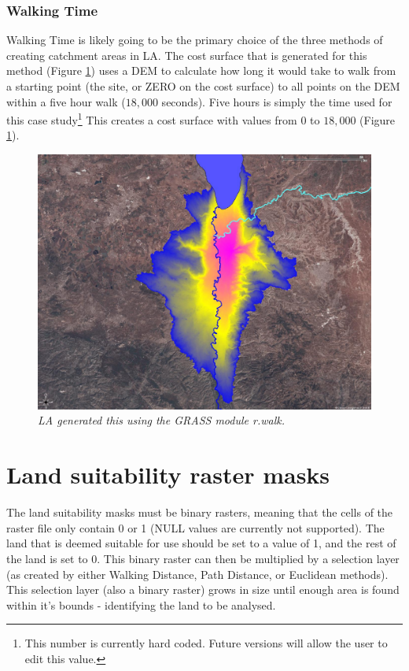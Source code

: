     \subsubsection{Walking Time}
      Walking Time is likely going to be the primary choice of the three methods of
      creating catchment areas in LA.  The cost surface that is
      generated for this method (Figure \ref{fig:rwalk}) uses a DEM to calculate
      how long it would take to walk from a starting point (the site, or ZERO on
      the cost surface) to all points on the DEM within a five hour walk ($18,000$
      seconds). Five hours is simply the time used for this case
      study\footnote{This number is currently hard coded. Future versions will
      allow the user to edit this value.} This creates a cost surface with values
      from $0$ to $18,000$ (Figure \ref{fig:rwalk}).  
\begin{figure}[htbp] 
  \includegraphics[width=\textwidth]{./images/costSurface.jpg}
  \caption{\label{fig:rwalk}\textit{LA generated this using the GRASS module r.walk.}}
\end{figure}
\section{Land suitability raster masks} 
  The land suitability masks must be binary rasters, meaning that the cells of
  the raster file only contain 0 or 1 (NULL values are currently not supported).
  The land that is deemed suitable for use should be set to a value of 1, and the
  rest of the land is set to 0.  This binary raster  can then be multiplied by a
  selection layer (as created by either Walking Distance, Path Distance,
  or Euclidean methods).  This selection layer (also a binary raster) grows in
  size until enough area is
  found within it's bounds - identifying the land to be analysed.

